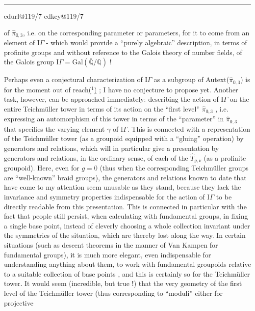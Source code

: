 \documentclass[11pt,a4paper]{article}
\makeatletter
\newif\ifreading
\newif\ifenglish
\def\CurrentScanURL{}
\def\CurrentPageKey{}
\def\CurrentApparatus{}
\newcommand{\scanpage}[1]{%
  \clearpage
  \expandafter\let\expandafter\CurrentScanURL\csname edurl@#1\endcsname
  \expandafter\let\expandafter\CurrentPageKey\csname edkey@#1\endcsname
  \def\CurrentApparatus{}%
  \hypertarget{scan-\CurrentPageKey}{}%
  \typeout{EDITION-SCAN: \CurrentPageKey; PDFPAGE: \the\numexpr\ReadonlyShipoutCounter+1\relax}%
  \ifreading
    \marginnote{\raggedright\scriptsize\sffamily\href{\CurrentScanURL}{119 / \csname edpage@#1\endcsname}}%
  \else
    \noindent{\small\sffamily\href{\CurrentScanURL}{[scan #1]}}\par\smallskip
  \fi}
\newcommand{\mspage}[1]{%
  \ifreading\marginnote{\raggedright\scriptsize\sffamily p.\,#1}[2\baselineskip]%
  \else\noindent{\small\sffamily[p.\,#1]}\par\smallskip\fi}
\newcommand{\margin}[1]{%
  \sbox{\MarginalTestBox}{\parbox{\marginparwidth}{\raggedright\footnotesize#1}}%
  \ifdim\dimexpr\ht\MarginalTestBox+\dp\MarginalTestBox\relax>3\baselineskip
    \par\smallskip\noindent\begin{minipage}{\linewidth}\hrule\smallskip
    {\footnotesize\textcolor{HandInk}{\ifenglish Marginal note:\else Note marginale :\fi\ #1}}\smallskip\hrule\end{minipage}\par\smallskip
  \else
    \marginnote{\raggedright\footnotesize\textcolor{HandInk}{#1}}%
  \fi}
\newcommand{\finishscan}{\ifx\CurrentApparatus\empty\else\par\bigskip\noindent\rule{.35\linewidth}{.35pt}\par\smallskip{\footnotesize\setlength{\parskip}{3pt}\CurrentApparatus}\fi}
\newcommand{\notecall}[3]{\hypertarget{#2}{\hyperlink{note-#1}{#3}}}
\makeatother
\begin{document}
\margin{6}

\finishscan
\scanpage{119/7}
\mspage{5}

of $\hat{\pi}_{0,3}$, i.e. on the corresponding parameter or parameters, for it
to come from an element of $\mathrm{I}\!\Gamma$ - which would provide a
``purely algebraic'' description, in terms of profinite groups and without
reference to the Galois theory of number fields, of the Galois
group $\mathrm{I}\!\Gamma = \mathrm{Gal}(\bar{\mathbb{Q}}/\mathbb{Q})$ !

Perhaps even a conjectural characterization of $\mathrm{I}\!\Gamma$
as a subgroup of Autext($\hat{\pi}_{0,3}$) is for the moment out of
reach\notecall{copy1-1}{call-esq_119_007-1-1}{($^1$)} ; I have no conjecture to propose yet. Another
task, however, can be approached immediately: describing
the action of $\mathrm{I}\!\Gamma$ on the entire Teichmüller tower in terms of its
action on the ``first level'' $\hat{\pi}_{0,3}$ , i.e. expressing an automorphism
of this tower in terms of the ``parameter'' in $\hat{\pi}_{0,3}$ that specifies
the varying element $\gamma$ of $\mathrm{I}\!\Gamma$. This is connected with a representation of the
Teichmüller tower (as a groupoid equipped with a ``gluing''
operation) by generators and relations, which will in particular give
a presentation by generators and relations, in the ordinary sense, of
each of the $\hat{T}_{g,\nu}$ (as a profinite groupoid). Here, even for
$g = 0$ (thus when the corresponding Teichmüller groups are
``well-known'' braid groups), the generators and relations
known to date that have come to my attention seem unusable
as they stand, because they lack the invariance and
symmetry properties indispensable for the action of $\mathrm{I}\!\Gamma$ to be directly
readable from this presentation. This is connected in particular with the fact that
people still persist, when calculating with fundamental
groups, in fixing a single base point, instead of cleverly choosing
a whole collection invariant under the symmetries of the
situation, which are thereby lost along the way. In certain situations
(such as descent theorems in the manner of Van Kampen for fundamental
groups), it is much more elegant, even indispensable for understanding
anything about them, to work with fundamental groupoids
relative to a suitable collection of base points , and this is certainly
so for the Teichmüller tower. It would seem (incredible,
but true !) that the very geometry of the first level of the
Teichmüller tower (thus corresponding to ``moduli'' either for projective
\end{document}
